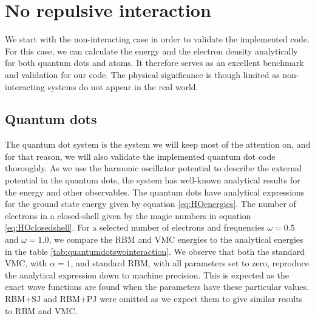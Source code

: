 \section{No repulsive interaction} \label{sec:norepulsive}
We start with the non-interacting case in order to validate the implemented code. For this case, we can calculate the energy and the electron density analytically for both quantum dots and atoms. It therefore serves as an excellent benchmark and validation for our code. The physical significance is though limited as non-interacting systems do not appear in the real world.

\subsection{Quantum dots}
The quantum dot system is the system we will keep most of the attention on, and for that reason, we will also validate the implemented quantum dot code thoroughly. As we use the harmonic oscillator potential to describe the external potential in the quantum dots, the system has well-known analytical results for the energy and other observables. The quantum dots have analytical expressions for the ground state energy given by equation \eqref{eq:HOenergies}. The number of electrons in a closed-shell given by the magic numbers in equation \eqref{eq:HOclosedshell}. For a selected number of electrons and frequencies $\omega=0.5$ and $\omega=1.0$, we compare the RBM and VMC energies to the analytical energies in the table \eqref{tab:quantumdotswointeraction}. We observe that both the standard VMC, with $\alpha=1$, and standard RBM, with all parameters set to zero, reproduce the analytical expression down to machine precision. This is expected as the exact wave functions are found when the parameters have these particular values. RBM+SJ and RBM+PJ were omitted as we expect them to give similar results to RBM and VMC.


